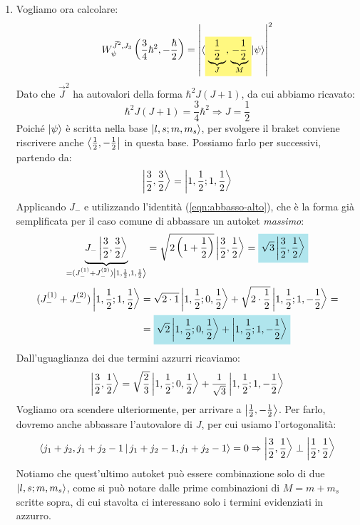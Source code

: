 \documentclass[../../FisicaTeorica.tex]{subfiles}
\begin{document}
\begin{enumerate}
\item Vogliamo ora calcolare:
\begin{align}
W_\psi^{\vec{J}^2, J_3}\left(\frac{3}{4}\hbar^2, -\frac{\hbar}{2}\right) =\left | \langle{\hlc{Yellow}{\underbrace{\frac{1}{2}}_{J}, \underbrace{-\frac{1}{2}}_{M}}|\psi\rangle}\right|^2
\label{eqn:probability-angular-3}
\end{align}
Dato che $\vec{J}^2$ ha autovalori della forma $\hbar^2 J(J+1)$, da cui abbiamo ricavato:
\[
\hbar^2J(J+1)=\frac{3}{4}\hbar^2\Rightarrow J=\frac{1}{2}
\]
Poiché $\Ket{\psi}$ è scritta nella base $\Ket{l,s;m,m_s}$, per svolgere il braket conviene riscrivere anche $\Bra{\frac{1}{2},-\frac{1}{2}}$ in questa base. Possiamo farlo per  successivi, partendo da:
\[
\Ket{\frac{3}{2}, \frac{3}{2}} =\Ket{1, \frac{1}{2};1,\frac{1}{2}}
\]
Applicando $J_-$ e utilizzando l'identità (\ref{eqn:abbasso-alto}), che è la forma già semplificata per il caso comune di abbassare un autoket \textit{massimo}:
\[
\underbrace{J_- \ket{\frac{3}{2}, \frac{3}{2}}}_{=(J_-^{(1)}+J_-^{(2)})\ket{1,\frac{1}{2},1,\frac{1}{2}}} = \sqrt{2\left(1+\frac{1}{2}\right)}\ket{\frac{3}{2},\frac{1}{2}} = \hlc{SkyBlue}{\sqrt{3}\ket{\frac{3}{2},\frac{1}{2}}}
\]
\begin{align*}
(J_-^{(1)} +J_-^{(2)})\ket{1,\frac{1}{2};1,\frac{1}{2}} &= \sqrt{2\cdot 1}\ket{1,\frac{1}{2};0,\frac{1}{2}} + \sqrt{2\cdot \frac{1}{2}}\ket{1,\frac{1}{2};1,-\frac{1}{2}}=\\
&=\hlc{SkyBlue}{ \sqrt{2}\ket{1,\frac{1}{2};0,\frac{1}{2}}+\ket{1,\frac{1}{2};1, -\frac{1}{2}}}
\end{align*}
Dall'uguaglianza dei due termini azzurri ricaviamo:
\begin{align}
\Ket{\frac{3}{2},\frac{1}{2}}=\sqrt{\frac{2}{3}}\Ket{1,\frac{1}{2};0,\frac{1}{2}} +\frac{1}{\sqrt{3}}\Ket{1,\frac{1}{2};1,-\frac{1}{2}}
\label{eqn:tremezzi}
\end{align}
Vogliamo ora scendere ulteriormente, per arrivare a $\Ket{\frac{1}{2},-\frac{1}{2}}$. Per farlo, dovremo anche abbassare l'autovalore di $J$, per cui usiamo l'ortogonalità:
\begin{align*}
\Braket{j_1+j_2, j_1+j_2-1| j_1 + j_2-1, j_1+j_2-1} = 0 \Rightarrow \Ket{\frac{3}{2},\frac{1}{2}} \perp \Ket{\frac{1}{2},\frac{1}{2}}
\end{align*}
Notiamo che quest'ultimo autoket può essere combinazione solo di due $\Ket{l,s; m, m_s}$, come si può notare dalle prime combinazioni di $M=m+m_s$ scritte sopra, di cui stavolta ci interessano solo i termini evidenziati in azzurro.


\end{enumerate}
\end{document}
